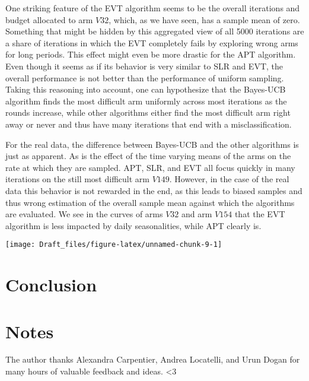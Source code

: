 \documentclass[12pt,]{article}
\begin{document}
One striking feature of the EVT algorithm seems to be the overall
iterations and budget allocated to arm \(V32\), which, as we have seen,
has a sample mean of zero. Something that might be hidden by this
aggregated view of all 5000 iterations are a share of iterations in
which the EVT completely fails by exploring wrong arms for long periods.
This effect might even be more drastic for the APT algorithm. Even
though it seems as if its behavior is very similar to SLR and EVT, the
overall performance is not better than the performance of uniform
sampling. Taking this reasoning into account, one can hypothesize that
the Bayes-UCB algorithm finds the most difficult arm uniformly across
most iterations as the rounds increase, while other algorithms either
find the most difficult arm right away or never and thus have many
iterations that end with a misclassification.

For the real data, the difference between Bayes-UCB and the other
algorithms is just as apparent. As is the effect of the time varying
means of the arms on the rate at which they are sampled. APT, SLR, and
EVT all focus quickly in many iterations on the still most difficult arm
\(V149\). However, in the case of the real data this behavior is not
rewarded in the end, as this leads to biased samples and thus wrong
estimation of the overall sample mean against which the algorithms are
evaluated. We see in the curves of arms \(V32\) and arm \(V154\) that
the EVT algorithm is less impacted by daily seasonalities, while APT
clearly is.

\begin{center}\texttt{[image: Draft\_files/figure-latex/unnamed-chunk-9-1]} \end{center}

\section{Conclusion}\label{conclusion}

\section{Notes}\label{notes}

The author thanks Alexandra Carpentier, Andrea Locatelli, and Urun Dogan
for many hours of valuable feedback and ideas. \textless{}3
\end{document}
